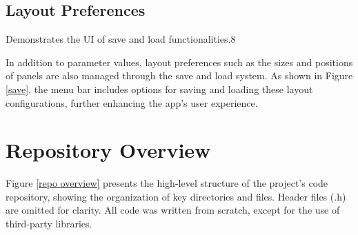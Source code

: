 \subsection{Layout Preferences}

{Demonstrates the UI of save and load functionalities.}{8}

In addition to parameter values, layout preferences such as the sizes and positions of panels are also managed through the save and load system. As shown in Figure \ref{save}, the menu bar includes options for saving and loading these layout configurations, further enhancing the app’s user experience.


\section{Repository Overview}

Figure \ref{repo overview} presents the high-level structure of the project's code repository, showing the organization of key directories and files. Header files (.h) are omitted for clarity. All code was written from scratch, except for the use of third-party libraries.



